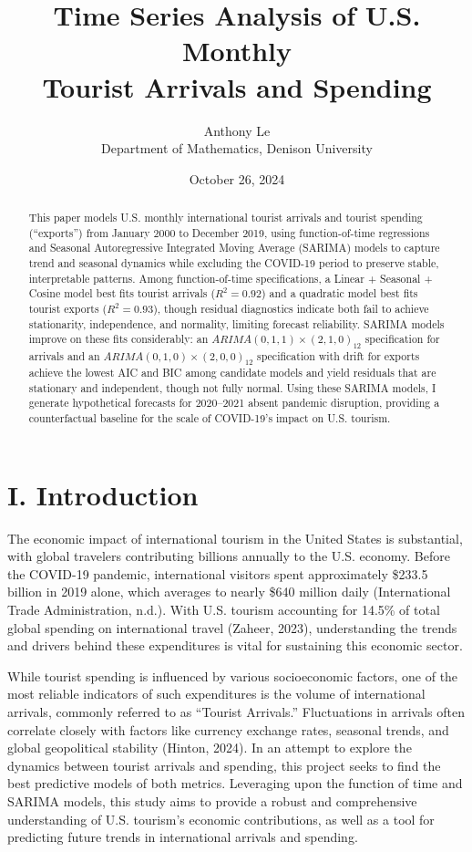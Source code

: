 \documentclass[11pt]{article}
\title{\textbf{Time Series Analysis of U.S. Monthly \\ Tourist Arrivals and Spending}}
\author{Anthony Le \\[0.3em] \normalsize Department of Mathematics, Denison University}
\date{October 26, 2024}
\begin{document}
\maketitle

\begin{abstract}
\noindent This paper models U.S. monthly international tourist arrivals and tourist spending (``exports'') from January 2000 to December 2019, using function-of-time regressions and Seasonal Autoregressive Integrated Moving Average (SARIMA) models to capture trend and seasonal dynamics while excluding the COVID-19 period to preserve stable, interpretable patterns. Among function-of-time specifications, a Linear + Seasonal + Cosine model best fits tourist arrivals ($R^2 = 0.92$) and a quadratic model best fits tourist exports ($R^2 = 0.93$), though residual diagnostics indicate both fail to achieve stationarity, independence, and normality, limiting forecast reliability. SARIMA models improve on these fits considerably: an $ARIMA(0,1,1)\times(2,1,0)_{12}$ specification for arrivals and an $ARIMA(0,1,0)\times(2,0,0)_{12}$ specification with drift for exports achieve the lowest AIC and BIC among candidate models and yield residuals that are stationary and independent, though not fully normal. Using these SARIMA models, I generate hypothetical forecasts for 2020--2021 absent pandemic disruption, providing a counterfactual baseline for the scale of COVID-19's impact on U.S. tourism.
\end{abstract}

\section{I. Introduction}

The economic impact of international tourism in the United States is substantial, with global travelers contributing billions annually to the U.S. economy. Before the COVID-19 pandemic, international visitors spent approximately \$233.5 billion in 2019 alone, which averages to nearly \$640 million daily (International Trade Administration, n.d.). With U.S. tourism accounting for 14.5\% of total global spending on international travel (Zaheer, 2023), understanding the trends and drivers behind these expenditures is vital for sustaining this economic sector.

While tourist spending is influenced by various socioeconomic factors, one of the most reliable indicators of such expenditures is the volume of international arrivals, commonly referred to as ``Tourist Arrivals.'' Fluctuations in arrivals often correlate closely with factors like currency exchange rates, seasonal trends, and global geopolitical stability (Hinton, 2024). In an attempt to explore the dynamics between tourist arrivals and spending, this project seeks to find the best predictive models of both metrics. Leveraging upon the function of time and SARIMA models, this study aims to provide a robust and comprehensive understanding of U.S. tourism's economic contributions, as well as a tool for predicting future trends in international arrivals and spending.
\end{document}

